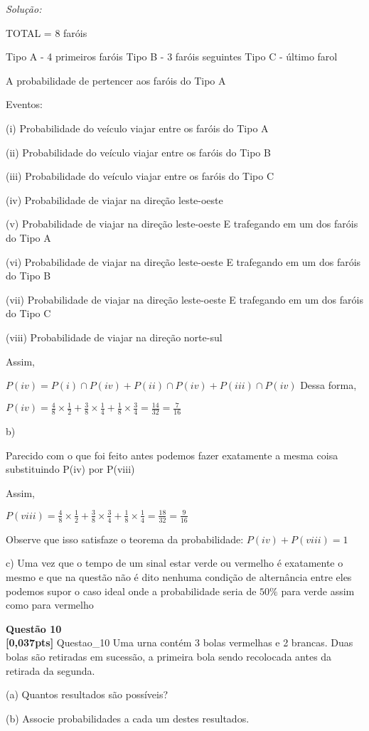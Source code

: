 \documentclass{article}
\newenvironment{problem}[2][Questão]
    { \begin{mdframed}[backgroundcolor=gray!20] \textbf{#1 #2} \\}
    {  \end{mdframed}}
\newenvironment{solution}
    {\textit{Solução:}}
    {}
\begin{document}
\begin{solution}

TOTAL = 8 faróis

Tipo A - 4 primeiros faróis
Tipo B - 3 faróis seguintes
Tipo C - último farol

A probabilidade de pertencer aos faróis do Tipo A

Eventos:

(i) Probabilidade do veículo viajar entre os faróis do Tipo A

(ii) Probabilidade do veículo viajar entre os faróis do Tipo B

(iii) Probabilidade do veículo viajar entre os faróis do Tipo C

(iv) Probabilidade de viajar na direção leste-oeste

(v) Probabilidade de viajar na direção leste-oeste E trafegando em um dos faróis do Tipo A 

(vi) Probabilidade de viajar na direção leste-oeste E trafegando em um dos faróis do Tipo B

(vii) Probabilidade de viajar na direção leste-oeste E trafegando em um dos faróis do Tipo C

(viii) Probabilidade de viajar na direção norte-sul

Assim,

$P(iv) = P(i) \cap P(iv) + P(ii) \cap P(iv) + P(iii) \cap P(iv) $
Dessa forma,

$ P(iv) = \frac{4}{8} \times \frac{1}{2} + \frac{3}{8} \times \frac{1}{4} + \frac{1}{8} \times \frac{3}{4} = \frac{14}{32} = \frac{7}{16}$

b) 

Parecido com o que foi feito antes podemos fazer exatamente a mesma coisa substituindo P(iv) por P(viii)

Assim,

$P(viii) = \frac{4}{8} \times \frac{1}{2} + \frac{3}{8} \times \frac{3}{4} + \frac{1}{8} \times \frac{1}{4} = \frac{18}{32} = \frac{9}{16}$

Observe que isso satisfaze o teorema da probabilidade: $P(iv) + P(viii) = 1$

c)
Uma vez que o tempo de um sinal estar verde ou vermelho é exatamente o mesmo e que na questão não é dito nenhuma condição de alternância entre eles podemos supor o caso ideal onde a probabilidade seria de $50\%$ para verde assim como para vermelho

\end{solution}

\begin{problem}{10}
\textbf{[0,037pts]} Questao\_10 Uma urna contém 3 bolas vermelhas e 2 brancas. Duas bolas são retiradas em sucessão, a 
primeira bola sendo recolocada antes da retirada da segunda. 

(a) Quantos resultados são possíveis? 

(b) Associe probabilidades a cada um destes resultados.

\end{problem}
\end{document}
